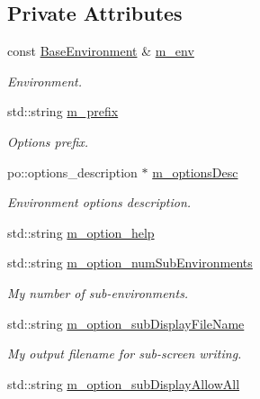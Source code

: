\subsection*{Private Attributes}
\begin{DoxyCompactItemize}
\item 
const \hyperlink{class_q_u_e_s_o_1_1_base_environment}{Base\-Environment} \& \hyperlink{class_q_u_e_s_o_1_1_environment_options_afe57e2cd6bb9e71df65fe6d133371478}{m\-\_\-env}
\begin{DoxyCompactList}\small\item\em Environment. \end{DoxyCompactList}\item 
std\-::string \hyperlink{class_q_u_e_s_o_1_1_environment_options_aca57a4ae24af2c2d1437f6a4d51de6a6}{m\-\_\-prefix}
\begin{DoxyCompactList}\small\item\em Options prefix. \end{DoxyCompactList}\item 
po\-::options\-\_\-description $\ast$ \hyperlink{class_q_u_e_s_o_1_1_environment_options_aa1089e3d1ddc5a9c90fe14c96d668b16}{m\-\_\-options\-Desc}
\begin{DoxyCompactList}\small\item\em Environment options description. \end{DoxyCompactList}\item 
std\-::string \hyperlink{class_q_u_e_s_o_1_1_environment_options_a5db2dbd99ef52563cb42c348ee53ea47}{m\-\_\-option\-\_\-help}
\item 
std\-::string \hyperlink{class_q_u_e_s_o_1_1_environment_options_a681529984ebb07b3a2b6684cd3416917}{m\-\_\-option\-\_\-num\-Sub\-Environments}
\begin{DoxyCompactList}\small\item\em My number of sub-\/environments. \end{DoxyCompactList}\item 
std\-::string \hyperlink{class_q_u_e_s_o_1_1_environment_options_a500c18cec1f5a1f5d89fec2705ef9106}{m\-\_\-option\-\_\-sub\-Display\-File\-Name}
\begin{DoxyCompactList}\small\item\em My output filename for sub-\/screen writing. \end{DoxyCompactList}\item 
std\-::string \hyperlink{class_q_u_e_s_o_1_1_environment_options_a3ebc67b0780a7c5632461154099ea54b}{m\-\_\-option\-\_\-sub\-Display\-Allow\-All}

\end{DoxyCompactItemize}
